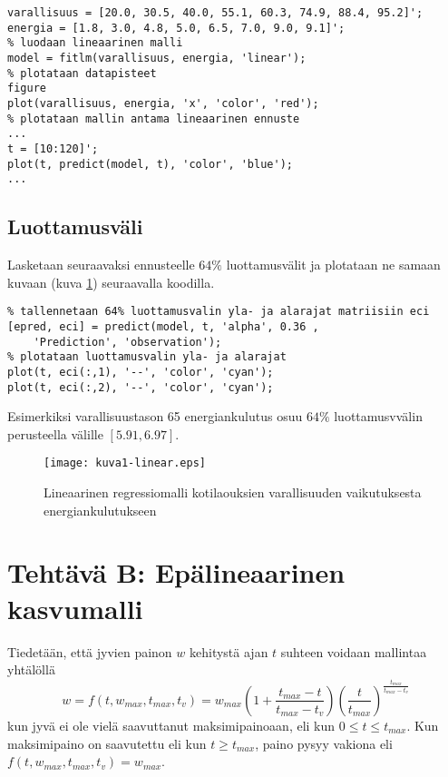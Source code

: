 \documentclass[a4paper,11pt]{article}
\begin{document}
{\begin{lstlisting}
varallisuus = [20.0, 30.5, 40.0, 55.1, 60.3, 74.9, 88.4, 95.2]';
energia = [1.8, 3.0, 4.8, 5.0, 6.5, 7.0, 9.0, 9.1]';
% luodaan lineaarinen malli
model = fitlm(varallisuus, energia, 'linear');
% plotataan datapisteet
figure
plot(varallisuus, energia, 'x', 'color', 'red');
% plotataan mallin antama lineaarinen ennuste
...
t = [10:120]';
plot(t, predict(model, t), 'color', 'blue');
...
\end{lstlisting}

\subsection{Luottamusväli}

Lasketaan seuraavaksi ennusteelle $64\%$ luottamusvälit ja plotataan ne samaan kuvaan (kuva \ref{fig:k1}) seuraavalla koodilla.

\begin{lstlisting}
% tallennetaan 64% luottamusvalin yla- ja alarajat matriisiin eci
[epred, eci] = predict(model, t, 'alpha', 0.36 ,
    'Prediction', 'observation');
% plotataan luottamusvalin yla- ja alarajat
plot(t, eci(:,1), '--', 'color', 'cyan');
plot(t, eci(:,2), '--', 'color', 'cyan');
\end{lstlisting}

Esimerkiksi varallisuustason 65 energiankulutus osuu $64\%$ luottamusvvälin perusteella välille $[5.91, 6.97]$.

\begin{figure}
    \centering
    \texttt{[image: kuva1-linear.eps]}
    \caption{Lineaarinen regressiomalli kotilaouksien varallisuuden vaikutuksesta energiankulutukseen}
    \label{fig:k1}
\end{figure}

\section{Tehtävä B: Epälineaarinen kasvumalli}

Tiedetään, että jyvien painon $w$ kehitystä ajan $t$ suhteen voidaan mallintaa yhtälöllä
\begin{equation}
    w = f(t, w_{max}, t_{max}, t_v) = w_{max}(1+\frac{t_{max}-t}{t_{max}-t_v})(\frac{t}{t_{max}})^{\frac{t_{max}}{t_{max}-t_v}}
\end{equation}
kun jyvä ei ole vielä saavuttanut maksimipainoaan, eli kun $0 \leq t \leq t_{max}$. Kun maksimipaino on saavutettu eli kun $t \geq t_{max}$, paino pysyy vakiona eli $f(t, w_{max}, t_{max}, t_v) = w_{max}$.

}
\end{document}

